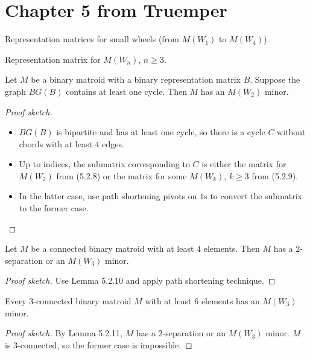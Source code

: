 \section{Chapter 5 from Truemper}


\begin{proposition}[5.2.8]
  \label{prop:5.2.8}
  Representation matrices for small wheels (from $M(W_{1})$ to $M(W_{4})$).
\end{proposition}

\begin{proposition}[5.2.9]
  \label{prop:5.2.9}
  Representation matrix for $M(W_{n})$, $n \geq 3$.
\end{proposition}

\begin{lemma}[5.2.10]
  \label{lem:5.2.10}
  Let $M$ be a binary matroid with a binary representation matrix $B$. Suppose the graph $BG(B)$ contains at least one cycle. Then $M$ has an $M(W_{2})$ minor.
\end{lemma}

\begin{proof}[Proof sketch]
  \begin{itemize}
    \item $BG(B)$ is bipartite and has at least one cycle, so there is a cycle $C$ without chords with at least $4$ edges.
    \item Up to indices, the submatrix corresponding to $C$ is either the matrix for $M(W_{2})$ from (5.2.8) or the matrix for some $M(W_{k})$, $k \geq 3$ from (5.2.9).
    \item In the latter case, use path shortening pivots on $1$s to convert the submatrix to the former case.
  \end{itemize}
\end{proof}

\begin{lemma}[5.2.11]
  \label{lem:5.2.11}
  Let $M$ be a connected binary matroid with at least $4$ elements. Then $M$ has a $2$-separation or an $M(W_3)$ minor.
\end{lemma}

\begin{proof}[Proof sketch]
  Use Lemma 5.2.10 and apply path shortening technique.
\end{proof}

\begin{corollary}[5.2.15]
  \label{cor:5.2.15}
  Every $3$-connected binary matroid $M$ with at least $6$ elements has an $M(W_3)$ minor.
\end{corollary}

\begin{proof}[Proof sketch]
  By Lemma 5.2.11, $M$ has a $2$-separation or an $M(W_{3})$ minor. $M$ is $3$-connected, so the former case is impossible.
\end{proof}
